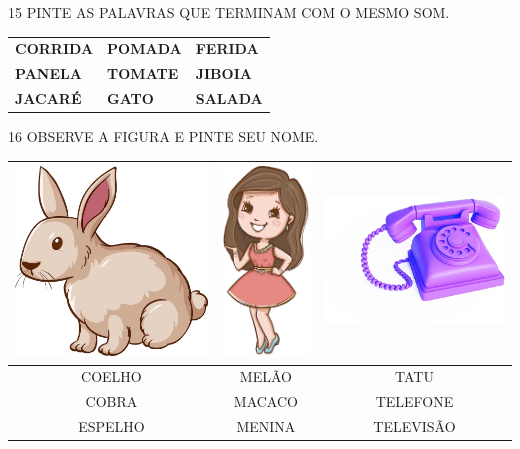 \num{15} PINTE AS PALAVRAS QUE TERMINAM COM O MESMO SOM.

\begin{longtable}[]{@{}lll@{}}
\toprule
\textbf{CORRIDA} & \textbf{POMADA} & \textbf{FERIDA}\tabularnewline
\textbf{PANELA} & \textbf{TOMATE} & \textbf{JIBOIA}\tabularnewline
\textbf{JACARÉ} & \textbf{GATO} & \textbf{SALADA}\tabularnewline
\bottomrule
\end{longtable}


\num{16} OBSERVE A FIGURA E PINTE SEU NOME.

\begin{center}
\begin{tabular}{ccc}
\multicolumn{1}{l}{\includegraphics[width=.2\textwidth]{media/image70.png}} & \multicolumn{1}{l}{\includegraphics[width=.2\textwidth]{media/image72.png} } & \multicolumn{1}{l}{\includegraphics[width=.2\textwidth]{media/image73.png}} \\ \hline
\multicolumn{1}{|c|}{COELHO} & \multicolumn{1}{c|}{MELÃO} & \multicolumn{1}{c|}{TATU} \\ \hline
\multicolumn{1}{|c|}{COBRA} & \multicolumn{1}{c|}{MACACO} & \multicolumn{1}{c|}{TELEFONE} \\ \hline
\multicolumn{1}{|c|}{ESPELHO} & \multicolumn{1}{c|}{MENINA} & \multicolumn{1}{c|}{TELEVISÃO} \\ \hline
\end{tabular}
\end{center}

